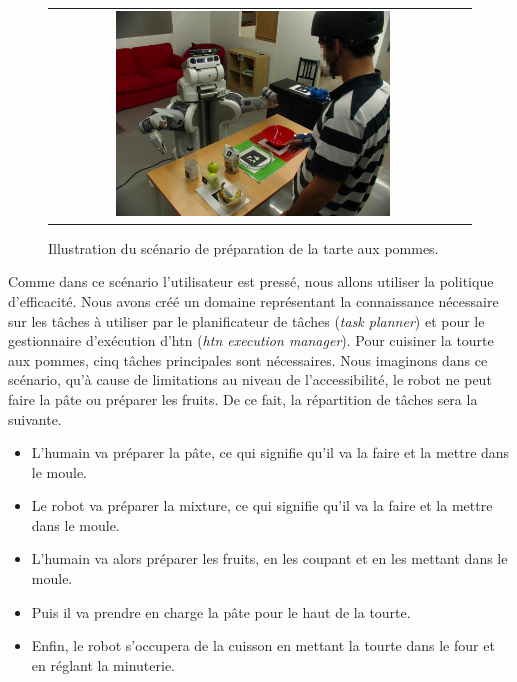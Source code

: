 \documentclass[a4paper,11pt,twoside]{StyleThese}
\begin{document}
\begin{figure}[ht!]

 \centering
 \begin{tabular}{cc}
  \includegraphics[width=0.69\textwidth]{img/scenario.JPG}
 \end{tabular}
 \caption{Illustration du scénario de préparation de la tarte aux pommes.}
 \label{fig:scenarioPie}
 \end{figure}

Comme dans ce scénario l'utilisateur est pressé, nous allons utiliser la politique d'efficacité.
Nous avons créé un domaine représentant la connaissance nécessaire sur les tâches à utiliser par le planificateur de tâches (\textit{task planner}) et pour le gestionnaire d'exécution d'htn (\textit{htn execution manager}).
Pour cuisiner la tourte aux pommes, cinq tâches principales sont nécessaires. Nous imaginons dans ce scénario, qu'à cause de limitations au niveau de l'accessibilité, le robot ne peut faire la pâte ou préparer les fruits. De ce fait, la répartition de tâches sera la suivante.




\begin{itemize}
\item L'humain va préparer la pâte, ce qui signifie qu'il va la faire et la mettre dans le moule.
\item Le robot va préparer la mixture, ce qui signifie qu'il va la faire et la mettre dans le moule.
\item L'humain va alors préparer les fruits, en les coupant et en les mettant dans le moule.
\item Puis il va prendre en charge la pâte pour le haut de la tourte.
\item Enfin, le robot s'occupera de la cuisson en mettant la tourte dans le four et en réglant la minuterie.
\end{itemize} 
\end{document}
